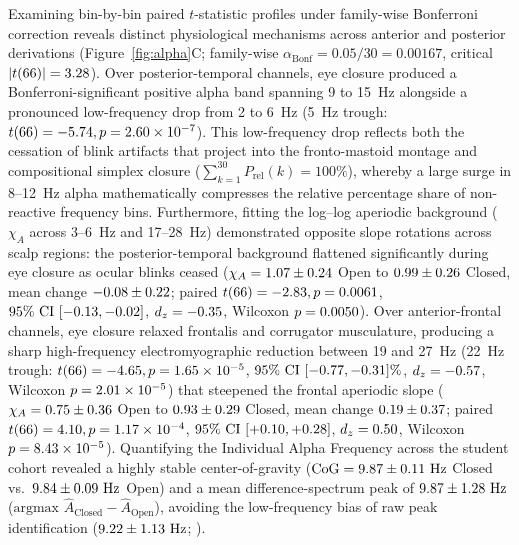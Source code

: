 \documentclass[11pt,letterpaper]{article}
\providecommand{\TempFiveHzT}{-5.74}
\providecommand{\TempFiveHzP}{2.60\times 10^{-7}}
\providecommand{\FrontTwentyTwoHzT}{-4.65}
\begin{document}
Examining bin-by-bin paired $t$-statistic profiles under family-wise Bonferroni correction reveals distinct physiological mechanisms across anterior and posterior derivations (Figure~\ref{fig:alpha}C; family-wise $\alpha_{\text{Bonf}} = 0.05/30 = 0.00167$, critical $|t(66)| = 3.28$). Over posterior-temporal channels, eye closure produced a Bonferroni-significant positive alpha band spanning 9 to 15~Hz alongside a pronounced low-frequency drop from 2 to 6~Hz (5~Hz trough: $t(\AlphaDF) = \TempFiveHzT, p = \TempFiveHzP$). This low-frequency drop reflects both the cessation of blink artifacts that project into the fronto-mastoid montage and compositional simplex closure ($\sum_{k=1}^{30} P_{\text{rel}}(k) = 100\%$), whereby a large surge in 8--12~Hz alpha mathematically compresses the relative percentage share of non-reactive frequency bins. Furthermore, fitting the log--log aperiodic background ($\chi_A$ across 3--6~Hz and 17--28~Hz) demonstrated opposite slope rotations across scalp regions: the posterior-temporal background flattened significantly during eye closure as ocular blinks ceased ($\chi_A = 1.07 \pm 0.24$ Open to $0.99 \pm 0.26$ Closed, mean change $-0.08 \pm 0.22$; paired $t(66) = -2.83, p = 0.0061$, $95\%\text{ CI } [-0.13, -0.02]$, $d_z = -0.35$, Wilcoxon $p = 0.0050$). Over anterior-frontal channels, eye closure relaxed frontalis and corrugator musculature, producing a sharp high-frequency electromyographic reduction between 19 and 27~Hz (22~Hz trough: $t(\AlphaDF) = \FrontTwentyTwoHzT, p = \FrontTwentyTwoHzP$, $95\%\text{ CI } [-0.77, -0.31]\%$, $d_z = -0.57$, Wilcoxon $p = 2.01\times 10^{-5}$) that steepened the frontal aperiodic slope ($\chi_A = 0.75 \pm 0.36$ Open to $0.93 \pm 0.29$ Closed, mean change $0.19 \pm 0.37$; paired $t(66) = 4.10, p = 1.17\times 10^{-4}$, $95\%\text{ CI } [+0.10, +0.28]$, $d_z = 0.50$, Wilcoxon $p = 8.43\times 10^{-5}$). Quantifying the Individual Alpha Frequency across the student cohort revealed a highly stable center-of-gravity ($\text{CoG} = 9.87 \pm 0.11\text{ Hz}$ Closed vs.\ $9.84 \pm 0.09\text{ Hz}$ Open) and a mean difference-spectrum peak of $9.87 \pm 1.28\text{ Hz}$ ($\text{argmax } \hat{A}_{\text{Closed}} - \hat{A}_{\text{Open}}$), avoiding the low-frequency bias of raw peak identification ($9.22 \pm 1.13\text{ Hz}$; \citealp{corcoran2018,cannard2021validating}).
\end{document}

